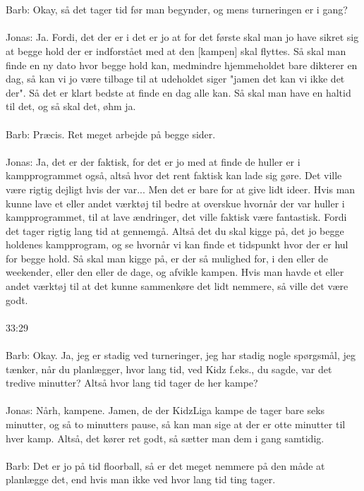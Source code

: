 \\\\
Barb: Okay, så det tager tid før man begynder, og mens turneringen er i gang?
\\\\
Jonas: Ja. Fordi, det der er i det er jo at for det første skal man jo have sikret sig at begge hold der er indforstået med at den [kampen] skal flyttes. Så skal man finde en ny dato hvor begge hold kan, medmindre hjemmeholdet bare dikterer en dag, så kan vi jo være tilbage til at udeholdet siger "jamen det kan vi ikke det der". Så det er klart bedste at finde en dag alle kan. Så skal man have en haltid til det, og så skal det, øhm ja.
\\\\
Barb: Præcis. Ret meget arbejde på begge sider.
\\\\
Jonas: Ja, det er der faktisk, for det er jo med at finde de huller er i kampprogrammet også, altså hvor det rent faktisk kan lade sig gøre. Det ville være rigtig dejligt hvis der var... Men det er bare for at give lidt ideer. Hvis man kunne lave et eller andet værktøj til bedre at overskue hvornår der var huller i kampprogrammet, til at lave ændringer, det ville faktisk være fantastisk. Fordi det tager rigtig lang tid at gennemgå. Altså det du skal kigge på, det jo begge holdenes kampprogram, og se hvornår vi kan finde et tidspunkt hvor der er hul for begge hold. Så skal man kigge på, er der så mulighed for, i den eller de weekender, eller den eller de dage, og afvikle kampen. Hvis man havde et eller andet værktøj til at det kunne sammenkøre det lidt nemmere, så ville det være godt. 
\\\\
33:29
\\\\
Barb: Okay. Ja, jeg er stadig ved turneringer, jeg har stadig nogle spørgsmål, jeg tænker, når du planlægger, hvor lang tid, ved Kidz f.eks., du sagde, var det tredive minutter? Altså hvor lang tid tager de her kampe?
\\\\
Jonas: Nårh, kampene. Jamen, de der KidzLiga kampe de tager bare seks minutter, og så to minutters pause, så kan man sige at der er otte minutter til hver kamp. Altså, det kører ret godt, så sætter man dem i gang samtidig.
\\\\
Barb: Det er jo på tid floorball, så er det meget nemmere på den måde at planlægge det, end hvis man ikke ved hvor lang tid ting tager.
